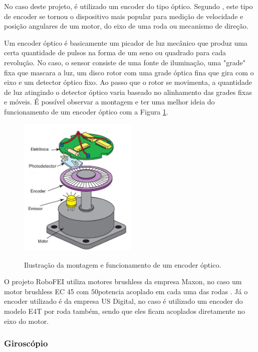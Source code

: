 \documentclass[acronym, symbols, table]{fei}
\begin{document}
				No caso deste projeto, é utilizado um encoder do tipo óptico. Segundo \textcite{siegwart2011introduction}, este tipo de encoder se tornou o dispositivo mais popular para medição de velocidade e posição angulares de um motor, do eixo de uma roda ou mecanismo de direção.
				
				Um encoder óptico é basicamente um picador de luz mecânico que produz uma certa quantidade de pulsos na forma de um seno ou quadrado para cada revolução. No caso, o sensor consiste de uma fonte de iluminação, uma "grade" fixa que mascara a luz, um disco rotor com uma grade óptica fina que gira com o eixo e um detector óptico fixo. Ao passo que o rotor se movimenta, a quantidade de luz atingindo o detector óptico varia baseado no alinhamento das grades fixas e móveis. É possível observar a montagem e ter uma melhor ideia do funcionamento de um encoder óptico com a Figura \ref{fig:optical_encoder}.
				
				\begin{figure}[!htb]
					\centering
					\caption{Ilustração da montagem e funcionamento de um encoder óptico.} 
					\includegraphics[width=0.5\textwidth]{encoder_optico.png}
					\label{fig:optical_encoder}
				\end{figure}
				
				O projeto RoboFEI utiliza motores brushless da empresa Maxon\textregistered, no caso um motor brushless EC 45 com $50$\gls{potencia} acoplado em cada uma das rodas \cite{ec45_maxon}. Já o encoder utilizado é da empresa US Digital\textregistered \cite{e4t_encoder}, no caso é utilizado um encoder do modelo E4T por roda também, sendo que eles ficam acoplados diretamente no eixo do motor.
			
			\subsubsection{Giroscópio} \label{sec:sensores_giroscopio}
			
\end{document}
